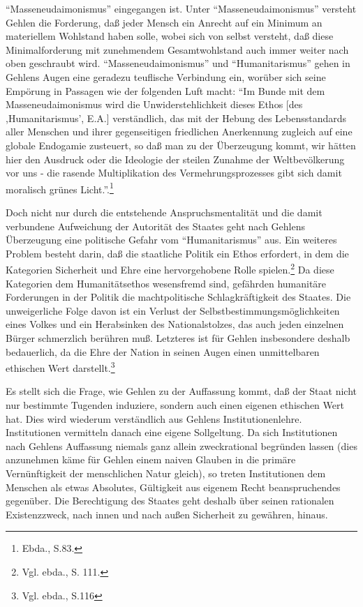\documentclass[12pt,a4paper]{article}
\begin{document}
"`Masseneudaimonismus"' eingegangen ist. Unter "`Masseneudaimonismus"'
versteht Gehlen die Forderung, daß jeder Mensch ein Anrecht auf ein Minimum
an materiellem Wohlstand haben solle, wobei sich von selbst versteht,
daß diese Minimalforderung mit zunehmendem Gesamtwohlstand auch immer weiter
nach oben geschraubt wird. "`Masseneudaimonismus"' und "`Humanitarismus"'
gehen in Gehlens Augen eine geradezu teuflische Verbindung ein, worüber sich
seine Empörung in Passagen wie der folgenden Luft macht: "`Im Bunde mit dem
Masseneudaimonismus wird die Unwiderstehlichkeit dieses Ethos [des
,Humanitarismus', E.A.] verständlich, das mit der Hebung des Lebensstandards
aller Menschen und ihrer gegenseitigen friedlichen Anerkennung zugleich auf
eine globale Endogamie zusteuert, so daß man zu der Überzeugung kommt, wir
hätten hier den Ausdruck oder die Ideologie der steilen Zunahme der
Weltbevölkerung vor uns - die rasende Multiplikation des Vermehrungsprozesses
gibt sich damit moralisch grünes Licht."'.\footnote{Ebda., S.83.}

Doch nicht nur durch die entstehende Anspruchsmentalität und die damit
verbundene Aufweichung der Autorität des Staates geht nach Gehlens
Überzeugung eine politische Gefahr vom "`Humanitarismus"' aus. Ein
weiteres Problem besteht darin, daß die staatliche Politik ein Ethos
erfordert, in dem die Kategorien Sicherheit und Ehre eine hervorgehobene
Rolle spielen.\footnote{Vgl. ebda., S. 111.} Da diese Kategorien dem
Humanitätsethos wesensfremd sind, gefährden humanitäre Forderungen in
der Politik die machtpolitische Schlagkräftigkeit des Staates. Die
unweigerliche Folge davon ist ein Verlust der
Selbstbestimmungsmöglichkeiten eines Volkes und ein Herabsinken des
Nationalstolzes, das auch jeden einzelnen Bürger schmerzlich berühren
muß. Letzteres ist für Gehlen insbesondere deshalb bedauerlich, da die
Ehre der Nation in seinen Augen einen unmittelbaren ethischen Wert
darstellt.\footnote{Vgl. ebda., S.116}

Es stellt sich die Frage, wie Gehlen zu der Auffassung kommt, daß der Staat
nicht nur bestimmte Tugenden induziere, sondern auch einen eigenen ethischen
Wert hat. Dies wird wiederum verständlich aus Gehlens Institutionenlehre.
Institutionen vermitteln danach eine eigene Sollgeltung. Da sich
Institutionen nach Gehlens Auffassung niemals ganz allein zweckrational
begründen lassen (dies anzunehmen käme für Gehlen einem naiven Glauben in
die primäre Vernünftigkeit der menschlichen Natur gleich), so treten
Institutionen dem Menschen als etwas Absolutes, Gültigkeit aus eigenem Recht
beanspruchendes gegenüber. Die Berechtigung des Staates geht deshalb über
seinen rationalen Existenzzweck, nach innen und nach außen Sicherheit zu
gewähren, hinaus.
\end{document}
